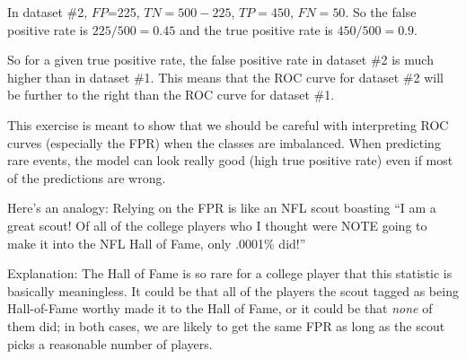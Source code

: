 \documentclass[11pt]{article}
\begin{document}
\begin{enumerate}[leftmargin=*]
\begin{enumerate}
In dataset \#2, $FP$=225, $TN = 500-225$, $TP = 450$, $FN = 50$.  So the false positive rate is $225/500 = 0.45$ and the true positive rate is $450/500 = 0.9$.

So for a given true positive rate, the false positive rate in dataset \#2 is much higher than in dataset \#1. This means that the ROC curve for dataset \#2 will be further to the right than the ROC curve for dataset \#1.

This exercise is meant to show that we should be careful with interpreting ROC curves (especially the FPR) when the classes are imbalanced. When predicting rare events, the model can look really good (high true positive rate) even if most of the predictions are wrong. 

Here's an analogy: Relying on the FPR is like an NFL scout boasting ``I am a great scout! Of all of the college players who I thought were NOTE going to make it into the NFL Hall of Fame, only .0001\% did!''

Explanation: The Hall of Fame is so rare for a college player that this statistic is basically meaningless. It could be that all of the players the scout tagged as being Hall-of-Fame worthy made it to the Hall of Fame, or it could be that \emph{none} of them did; in both cases, we are likely to get the same FPR as long as the scout picks a reasonable number of players.


\end{enumerate}

\end{enumerate}
\end{document}
